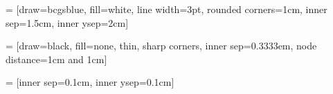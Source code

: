 \usepackage[utf8]{inputenc}
\usepackage{microtype}
\usepackage{wrapfig}
\usepackage{amsmath}
\usepackage{amsfonts}
\usepackage{anyfontsize}

\usepackage{tikz}
\usetikzlibrary{positioning}


\pagecolor{background}

 = [draw=bcgsblue, fill=white, line width=3pt,
rounded corners=1cm, inner sep=1.5cm, inner ysep=2cm]

 = [draw=black, fill=none, thin, sharp corners,
inner sep=0.3333em, node distance=1cm and 1cm]

 = [inner sep=0.1cm, inner ysep=0.1cm]

\newcommand{\MyTitle}{Electromagnetic switching of multiferroics}
\newcommand{\MyAuthors}{M. Baum$^1$, J. Stein$^1$, Th. Finger$^1$, N. Qureshi$^1$, J. Leist$^3$, S. Holbein$^1$, P. Becker-Bohatý$^2$, L. Bohatý$^2$, G. Eckold$^3$, M. Braden$^1$}
\newcommand{\MyAffiliations}{$^1$ II. Physikalisches Institut, Universität zu Köln\\
$^2$ Institut für Kristallographie, Universität zu Köln\\
$^3$ Institut für Physikalische Chemie, Universität Göttingen}


\renewcommand{\familydefault}{\sfdefault}

\makeatletter %
\renewcommand{\section}{\@startsection
  {section}                          %
  {1}                                %
  {0mm}                              %
  {-0\baselineskip}                  %
  {.5\baselineskip}                 %
  {\normalfont\LARGE\bfseries\color{bcgsred}}} %
\makeatother

\makeatletter %
\renewcommand{\subsection}{\@startsection
  {subsection}                          %
  {2}                                %
  {0mm}                              %
  {0.6\baselineskip}                  %
  {0.25\baselineskip}     %
  {\normalfont\Large\bfseries\color{bcgsblue}}} %
\makeatother

